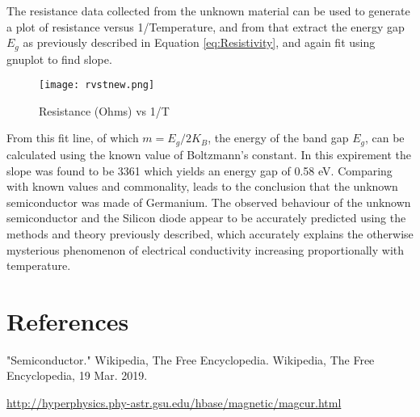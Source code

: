 \documentclass[twocolumn,11pt]{article}
\begin{document}
The resistance data collected from the unknown material can be used to generate a plot of resistance versus 1/Temperature, and from that extract the energy gap $E_g$ as previously described in Equation \ref{eq:Resistivity}, and again fit using gnuplot to find slope.




\begin{figure}[!h!t]
	\centering
		\texttt{[image: rvstnew.png]}
		\caption{Resistance (Ohms) vs 1/T}
	\label{fig:rsvt}
\end{figure} 
From this fit line, of which $m=E_g/2K_B$, the energy of the band gap $E_g$, can be calculated using the known value of Boltzmann's constant. In this expirement the slope was found to be 3361 which yields an energy gap of 0.58 eV. Comparing with known values and commonality, leads to the conclusion that the unknown semiconductor was made of Germanium.
The observed behaviour of the unknown semiconductor and the Silicon diode appear to be accurately predicted using the methods and theory previously described, which accurately explains the otherwise mysterious phenomenon of electrical conductivity increasing proportionally with temperature. 


\section*{References}

"Semiconductor." Wikipedia, The Free Encyclopedia. Wikipedia, The Free Encyclopedia, 19 Mar. 2019. 

\url{http://hyperphysics.phy-astr.gsu.edu/hbase/magnetic/magcur.html}
\end{document}
